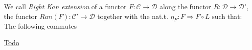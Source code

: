 \documentclass[preview]{standalone}
\begin{document}
	We call \emph{Right Kan extension} of a functor $F:\mathcal{C}\rightarrow\mathcal{D}$ along the functor $R:\mathcal{D} \rightarrow \mathcal{D}'$, 
	the functor $Ran(F):\mathcal{C}'\rightarrow \mathcal{D}$
	together with the nat.t. $\eta_F: F \Rightarrow F\circ L$ such that:\\
	The following commutes
	\href{https://ncatlab.org/nlab/show/Kan+extension#OrdinaryKanExtensions}{Todo}
\end{document}
